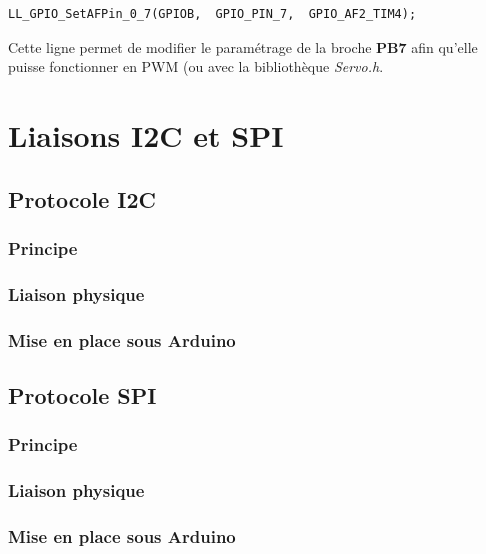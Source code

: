 \documentclass[a4paper,11pt,titlepage]{article} %
\begin{document}
\begin{lstlisting}
LL_GPIO_SetAFPin_0_7(GPIOB,  GPIO_PIN_7,  GPIO_AF2_TIM4);
\end{lstlisting}

Cette ligne permet de modifier le paramétrage de la broche \textbf{PB7} afin qu'elle puisse fonctionner en PWM (ou avec la bibliothèque \textsl{Servo.h}.


\newpage
\section{Liaisons I2C et SPI}

\subsection{Protocole I2C}

\subsubsection{Principe}

\subsubsection{Liaison physique}

\subsubsection{Mise en place sous Arduino}




\newpage
\subsection{Protocole SPI}

\subsubsection{Principe}

\subsubsection{Liaison physique}

\subsubsection{Mise en place sous Arduino}




\end{document}
